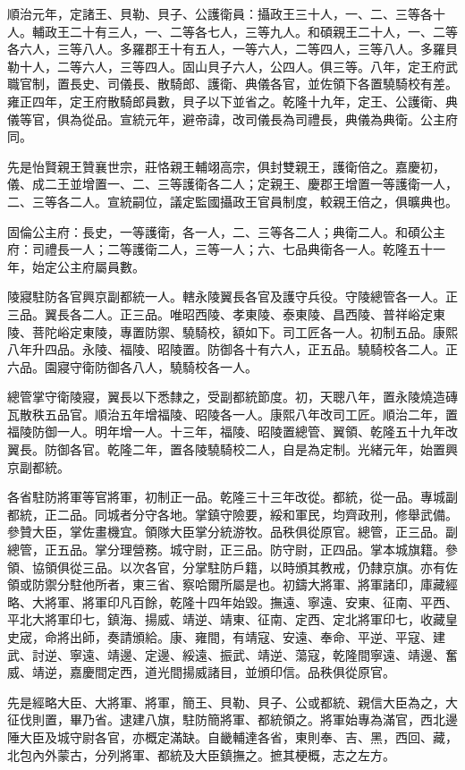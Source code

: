 \begin{pinyinscope}
順治元年，定諸王、貝勒、貝子、公護衛員：攝政王三十人，一、二、三等各十人。輔政王二十有三人，一、二等各七人，三等九人。和碩親王二十人，一、二等各六人，三等八人。多羅郡王十有五人，一等六人，二等四人，三等八人。多羅貝勒十人，二等六人，三等四人。固山貝子六人，公四人。俱三等。八年，定王府武職官制，置長史、司儀長、散騎郎、護衛、典儀各官，並佐領下各置驍騎校有差。雍正四年，定王府散騎郎員數，貝子以下並省之。乾隆十九年，定王、公護衛、典儀等官，俱為從品。宣統元年，避帝諱，改司儀長為司禮長，典儀為典衛。公主府同。

先是怡賢親王贊襄世宗，莊恪親王輔翊高宗，俱封雙親王，護衛倍之。嘉慶初，儀、成二王並增置一、二、三等護衛各二人；定親王、慶郡王增置一等護衛一人，二、三等各二人。宣統嗣位，議定監國攝政王官員制度，較親王倍之，俱曠典也。

固倫公主府：長史，一等護衛，各一人，二、三等各二人；典衛二人。和碩公主府：司禮長一人；二等護衛二人，三等一人；六、七品典衛各一人。乾隆五十一年，始定公主府屬員數。

陵寢駐防各官興京副都統一人。轄永陵翼長各官及護守兵役。守陵總管各一人。正三品。翼長各二人。正三品。唯昭西陵、孝東陵、泰東陵、昌西陵、普祥峪定東陵、菩陀峪定東陵，專置防禦、驍騎校，額如下。司工匠各一人。初制五品。康熙八年升四品。永陵、福陵、昭陵置。防御各十有六人，正五品。驍騎校各二人。正六品。園寢守衛防御各八人，驍騎校各一人。

總管掌守衛陵寢，翼長以下悉隸之，受副都統節度。初，天聰八年，置永陵燒造磚瓦散秩五品官。順治五年增福陵、昭陵各一人。康熙八年改司工匠。順治二年，置福陵防御一人。明年增一人。十三年，福陵、昭陵置總管、翼領、乾隆五十九年改翼長。防御各官。乾隆二年，置各陵驍騎校二人，自是為定制。光緒元年，始置興京副都統。

各省駐防將軍等官將軍，初制正一品。乾隆三十三年改從。都統，從一品。專城副都統，正二品。同城者分守各地。掌鎮守險要，綏和軍民，均齊政刑，修舉武備。參贊大臣，掌佐畫機宜。領隊大臣掌分統游牧。品秩俱從原官。總管，正三品。副總管，正五品。掌分理營務。城守尉，正三品。防守尉，正四品。掌本城旗籍。參領、協領俱從三品。以次各官，分掌駐防戶籍，以時頒其教戒，仍隸京旗。亦有佐領或防禦分駐他所者，東三省、察哈爾所屬是也。初鑄大將軍、將軍諸印，庫藏經略、大將軍、將軍印凡百餘，乾隆十四年始毀。撫遠、寧遠、安東、征南、平西、平北大將軍印七，鎮海、揚威、靖逆、靖東、征南、定西、定北將軍印七，收藏皇史宬，命將出師，奏請頒給。康、雍間，有靖寇、安遠、奉命、平逆、平寇、建武、討逆、寧遠、靖邊、定邊、綏遠、振武、靖逆、蕩寇，乾隆間寧遠、靖邊、奮威、靖逆，嘉慶間定西，道光間揚威諸目，並頒印信。品秩俱從原官。

先是經略大臣、大將軍、將軍，簡王、貝勒、貝子、公或都統、親信大臣為之，大征伐則置，畢乃省。逮建八旗，駐防簡將軍、都統領之。將軍始專為滿官，西北邊陲大臣及城守尉各官，亦概定滿缺。自畿輔達各省，東則奉、吉、黑，西回、藏，北包內外蒙古，分列將軍、都統及大臣鎮撫之。摭其梗概，志之左方。


\end{pinyinscope}
